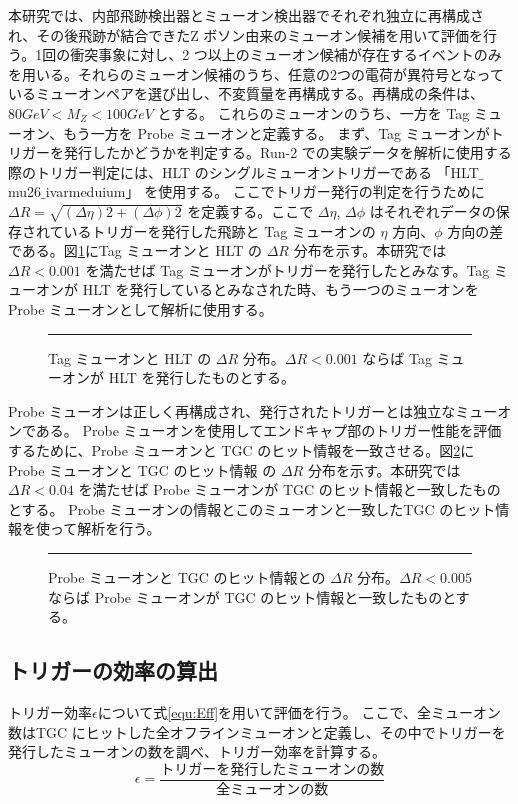本研究では、内部飛跡検出器とミューオン検出器でそれぞれ独立に再構成され、その後飛跡が結合できたZ ボソン由来のミューオン候補を用いて評価を行う。1回の衝突事象に対し、2 つ以上のミューオン候補が存在するイベントのみを用いる。それらのミューオン候補のうち、任意の2つの電荷が異符号となっているミューオンペアを選び出し、不変質量を再構成する。再構成の条件は、$80 GeV < M_Z < 100 GeV$ とする。
これらのミューオンのうち、一方を Tag ミューオン、もう一方を Probe ミューオンと定義する。
まず、Tag ミューオンがトリガーを発行したかどうかを判定する。Run-2 での実験データを解析に使用する際のトリガー判定には、HLT のシングルミューオントリガーである 「HLT$\_$mu26$\_$ivarmeduium」 を使用する。
ここでトリガー発行の判定を行うために $\Delta R = \sqrt{(\Delta \eta)2 + (\Delta \phi)2}$ を定義する。ここで $\Delta \eta$, $\Delta \phi$ はそれぞれデータの保存されているトリガーを発行した飛跡と Tag ミューオンの $\eta$ 方向、$\phi$ 方向の差である。図\ref{fig:tag_HLT}にTag ミューオンと HLT の $\Delta R$ 分布を示す。本研究では$\Delta R < 0.001$ を満たせば Tag ミューオンがトリガーを発行したとみなす。Tag ミューオンが HLT を発行しているとみなされた時、もう一つのミューオンを Probe ミューオンとして解析に使用する。

\begin{figure}[tb]
  \centering
  \rule{8cm}{6cm}
  \caption{Tag ミューオンと HLT の $\Delta R$ 分布。$\Delta R < 0.001$ ならば Tag ミューオンが HLT を発行したものとする。}
  \label{fig:tag_HLT}
\end{figure}

Probe ミューオンは正しく再構成され、発行されたトリガーとは独立なミューオンである。
Probe ミューオンを使用してエンドキャプ部のトリガー性能を評価するために、Probe ミューオンと TGC のヒット情報を一致させる。図\ref{fig:Probe_TGC}に Probe ミューオンと TGC のヒット情報 の $\Delta R$ 分布を示す。本研究では$\Delta R < 0.04$ を満たせば Probe ミューオンが TGC のヒット情報と一致したものとする。
Probe ミューオンの情報とこのミューオンと一致したTGC のヒット情報を使って解析を行う。

\begin{figure}[tb]
  \centering
  \rule{8cm}{6cm}
  \caption{Probe ミューオンと TGC のヒット情報との $\Delta R$ 分布。$\Delta R < 0.005$ ならば Probe ミューオンが TGC のヒット情報と一致したものとする。}
  \label{fig:Probe_TGC}
\end{figure}


\subsection{トリガーの効率の算出}
トリガー効率$\epsilon$について式\ref{equ:Eff}を用いて評価を行う。
ここで、全ミューオン数はTGC にヒットした全オフラインミューオンと定義し、その中でトリガーを発行したミューオンの数を調べ、トリガー効率を計算する。
\begin{equation}
　\epsilon=\frac{トリガーを発行したミューオンの数}{全ミューオンの数}
　\label{equ:Eff}
\end{equation}

